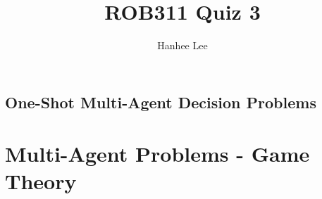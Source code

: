 \documentclass{article}
\title{ROB311 Quiz 3}
\author{Hanhee Lee}
\begin{document}
\maketitle

\tableofcontents
\newpage

\begin{center}
    \section*{One-Shot Multi-Agent Decision Problems}
\end{center}

\section{Multi-Agent Problems - Game Theory}

\end{document}
